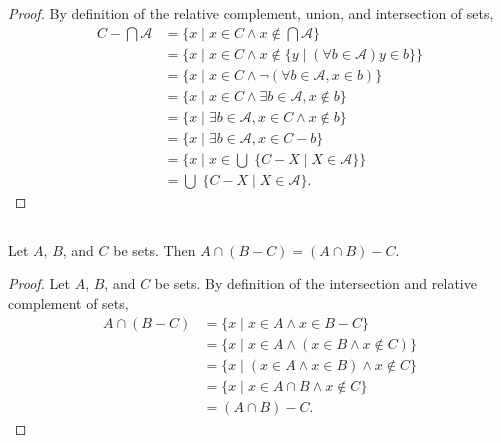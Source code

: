\documentclass{report}
\begin{document}
\begin{proof}
    By definition of the relative complement, union, and intersection of sets,
      \begin{align*}
        C - \bigcap \mathscr{A}
          & = \{ x \mid x \in C \land x \not\in \bigcap \mathscr{A} \} \\
          & = \{ x \mid x \in C \land
            x \not\in \{ y \mid (\forall b \in \mathscr{A}) y \in b \}\} \\
          & = \{ x \mid x \in C \land
            \neg(\forall b \in \mathscr{A}, x \in b) \} \\
          & = \{ x \mid x \in C \land
            \exists b \in \mathscr{A}, x \not\in b \} \\
          & = \{ x \mid
            \exists b \in \mathscr{A}, x \in C \land x \not\in b \} \\
          & = \{ x \mid \exists b \in \mathscr{A}, x \in C - b \} \\
          & = \{ x \mid x \in \bigcup\; \{ C - X \mid X \in \mathscr{A} \} \} \\
          & = \bigcup\; \{ C - X \mid X \in \mathscr{A} \}.
      \end{align*}

\end{proof}

\subsection{}%

Let $A$, $B$, and $C$ be sets.
Then $A \cap (B - C) = (A \cap B) - C$.

\begin{proof}


  Let $A$, $B$, and $C$ be sets.
  By definition of the intersection and relative complement of sets,
    \begin{align*}
      A \cap (B - C)
        & = \{ x \mid x \in A \land x \in B - C \} \\
        & = \{ x \mid x \in A \land (x \in B \land x \not\in C) \} \\
        & = \{ x \mid (x \in A \land x \in B) \land x \not\in C \} \\
        & = \{ x \mid x \in A \cap B \land x \not \in C \} \\
        & = (A \cap B) - C.
    \end{align*}

\end{proof}
\end{document}
